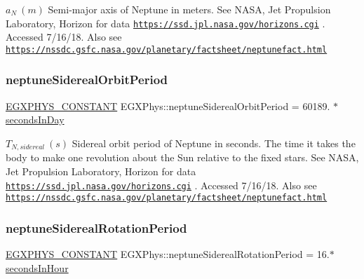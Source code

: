$ a_{N} \ (m)$ Semi-\/major axis of Neptune in meters. See N\+A\+SA, Jet Propulsion Laboratory, Horizon for data \href{https://ssd.jpl.nasa.gov/horizons.cgi}{\tt https\+://ssd.\+jpl.\+nasa.\+gov/horizons.\+cgi} . Accessed 7/16/18. Also see \href{https://nssdc.gsfc.nasa.gov/planetary/factsheet/neptunefact.html}{\tt https\+://nssdc.\+gsfc.\+nasa.\+gov/planetary/factsheet/neptunefact.\+html} \mbox{\label{group___e_g_x_phys-_constants-_astrophysics-_solar_system-_neptune-_orbit_gab23659c64bba74a4f087c736d57663ee}} 
\subsubsection{\texorpdfstring{neptune\+Sidereal\+Orbit\+Period}{neptuneSiderealOrbitPeriod}}
{\footnotesize\ttfamily \mbox{\hyperlink{group___e_g_x_phys-_constants-_macros_ga76980d288494ce1714c9ac68a95ba702}{E\+G\+X\+P\+H\+Y\+S\+\_\+\+C\+O\+N\+S\+T\+A\+NT}} E\+G\+X\+Phys\+::neptune\+Sidereal\+Orbit\+Period = 60189. $\ast$\mbox{\hyperlink{namespace_e_g_x_phys_a93d2a00d75411b58cbf63ab3fd1f8bc2}{seconds\+In\+Day}}}

$ T_{N,sidereal} \ (s)$ Sidereal orbit period of Neptune in seconds. The time it takes the body to make one revolution about the Sun relative to the fixed stars. See N\+A\+SA, Jet Propulsion Laboratory, Horizon for data \href{https://ssd.jpl.nasa.gov/horizons.cgi}{\tt https\+://ssd.\+jpl.\+nasa.\+gov/horizons.\+cgi} . Accessed 7/16/18. Also see \href{https://nssdc.gsfc.nasa.gov/planetary/factsheet/neptunefact.html}{\tt https\+://nssdc.\+gsfc.\+nasa.\+gov/planetary/factsheet/neptunefact.\+html} \mbox{\label{group___e_g_x_phys-_constants-_astrophysics-_solar_system-_neptune-_orbit_gafb7b0de520fc614727f84abdc6f3e62c}} 
\subsubsection{\texorpdfstring{neptune\+Sidereal\+Rotation\+Period}{neptuneSiderealRotationPeriod}}
{\footnotesize\ttfamily \mbox{\hyperlink{group___e_g_x_phys-_constants-_macros_ga76980d288494ce1714c9ac68a95ba702}{E\+G\+X\+P\+H\+Y\+S\+\_\+\+C\+O\+N\+S\+T\+A\+NT}} E\+G\+X\+Phys\+::neptune\+Sidereal\+Rotation\+Period = 16.$\ast$\mbox{\hyperlink{namespace_e_g_x_phys_a7c3165cd93e36f1fb8e9fef80f117bef}{seconds\+In\+Hour}}}

